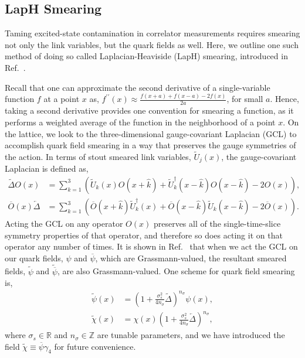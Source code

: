     \subsection{LapH Smearing}
    Taming excited-state contamination in correlator measurements requires smearing not only the link variables, but the quark fields as well. Here, we outline one such method of doing so called Laplacian-Heaviside (LapH) smearing, introduced in Ref.~\cite{Morningstar:2011ka}.
    
    Recall that one can approximate the second derivative of a single-variable function $f$ at a point $x$ as, $f^{\prime\prime}(x) \approx \frac{f(x+a) + f(x-a) - 2f(x)}{2a}$, for small $a$. Hence, taking a second derivative provides one convention for smearing a function, as it performs a weighted average of the function in the neighborhood of a point $x$. On the lattice, we look to the three-dimensional gauge-covariant Laplacian (GCL) to accomplish quark field smearing in a way that preserves the gauge symmetries of the action. In terms of stout smeared link variables, $\widetilde U_j(x)$, the gauge-covariant Laplacian is defined as,
    \begin{equation}\label{eq:quark_smearing}
    \begin{aligned} \widetilde{\Delta} O(x) &=\sum_{k=1}^{3}\left(\widetilde{U}_{k}(x) O(x+\hat{k})+\widetilde{U}_{k}^{\dagger}(x-\hat{k}) O(x-\hat{k})-2 O(x)\right), \\ \overline{O}(x) \overleftarrow{\Delta} &=\sum_{k=1}^{3}\left(\overline{O}(x+\hat{k}) \widetilde{U}_{k}^{\dagger}(x)+\overline{O}(x-\hat{k}) \widetilde{U}_{k}(x-\hat{k})-2 \overline{O}(x)\right). \end{aligned}
    \end{equation}
    Acting the GCL on any operator $O(x)$ preserves all of the single-time-slice symmetry properties of that operator, and therefore so does acting it on that operator any number of times. It is shown in Ref.~\cite{spectroscopy} that when we act the GCL on our quark fields, $\psi$ and $\overline\psi$, which are Grassmann-valued, the resultant smeared fields, $\widetilde{\psi}$ and $\widetilde{\overline\psi}$, are also Grassmann-valued. One scheme for quark field smearing is,
    \begin{equation}\label{eq:gauss_smear}
    \begin{aligned} \widetilde{\psi}(x) &=\left(1+\frac{\sigma_{s}^{2}}{4 n_{\sigma}} \widetilde{\Delta}\right)^{n_{\sigma}} \psi(x), \\ \widetilde{\chi}(x) &=\chi(x)\left(1+\frac{\sigma_{s}^{2}}{4 n_{\sigma}} \overleftarrow{\Delta}\right)^{n_{\sigma}}, \end{aligned}
    \end{equation}
    where $\sigma_s\in\mathbb{R}$ and $n_\sigma\in\mathbb{Z}$ are tunable parameters, and we have introduced the field $\widetilde{\chi} \equiv \overline \psi \gamma_4$ for future convenience.

